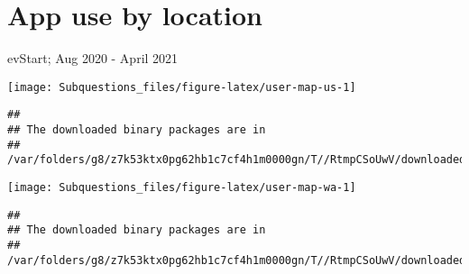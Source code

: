 \documentclass[
]{article}
\begin{document}
\hypertarget{app-use-by-location}{%
\section{App use by location}\label{app-use-by-location}}

evStart; Aug 2020 - April 2021

\texttt{[image: Subquestions\_files/figure-latex/user-map-us-1]}

\begin{verbatim}
## 
## The downloaded binary packages are in
##  /var/folders/g8/z7k53ktx0pg62hb1c7cf4h1m0000gn/T//RtmpCSoUwV/downloaded_packages
\end{verbatim}

\texttt{[image: Subquestions\_files/figure-latex/user-map-wa-1]}

\begin{verbatim}
## 
## The downloaded binary packages are in
##  /var/folders/g8/z7k53ktx0pg62hb1c7cf4h1m0000gn/T//RtmpCSoUwV/downloaded_packages
\end{verbatim}
\end{document}
